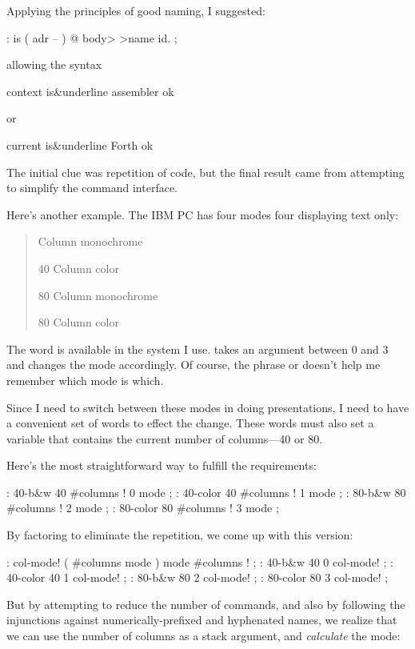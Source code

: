 \medbreak
Applying the principles of good naming, I suggested:

\begin{Code}
: is  ( adr -- )   @  body>  >name  id. ;
\end{Code}
allowing the syntax

\begin{Code}[commandchars=\&\{\}]
context is&underline{ assembler ok}
\end{Code}
or

\begin{Code}[commandchars=\&\{\}]
current is&underline{ Forth ok}
\end{Code}
The initial clue was repetition of code, but the final result came
from attempting to simplify the command interface.

Here's another example. The IBM PC has four modes four displaying text
only:

\begin{quote} Column monochrome

40 Column color

80 Column monochrome

80 Column color
\end{quote}
The word  is available in the \Forth{} system I use.
 takes an argument between 0 and 3 and changes the mode
accordingly. Of course, the phrase  or 
doesn't help me remember which mode is which.

Since I need to switch between these modes in doing presentations, I
need to have a convenient set of words to effect the change. These
words must also set a variable that contains the current number of
columns---40 or 80.

Here's the most straightforward way to fulfill the requirements:

\begin{Code}
: 40-b&w       40 #columns !  0 mode ;
: 40-color     40 #columns !  1 mode ;
: 80-b&w       80 #columns !  2 mode ;
: 80-color     80 #columns !  3 mode ;
\end{Code}
By factoring to eliminate the repetition, we come up with this version:

\begin{Code}
: col-mode!     ( #columns mode )  mode  #columns ! ;
: 40-b&w       40 0 col-mode! ;
: 40-color     40 1 col-mode! ;
: 80-b&w       80 2 col-mode! ;
: 80-color     80 3 col-mode! ;
\end{Code}
But by attempting to reduce the number of commands, and also by
following the injunctions against numerically-prefixed and hyphenated
names, we realize that we can use the number of columns as a stack
argument, and \emph{calculate} the mode:

